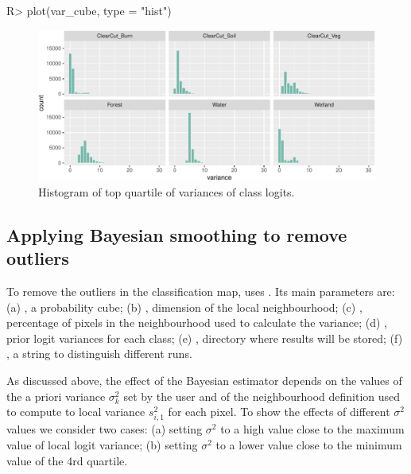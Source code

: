 \documentclass[
  shortnames]{jss}
\begin{document}
\begin{CodeChunk}
\begin{CodeInput}
R> plot(var_cube, type = "hist")
\end{CodeInput}
\begin{figure}[h]

{\centering \includegraphics{Bayesian_smoothing_JSS_files/figure-latex/vhist-1} 

}

\caption[Histogram of top quartile of variances of class logits]{Histogram of top quartile of variances of class logits.}\label{fig:vhist}
\end{figure}
\end{CodeChunk}

\hypertarget{applying-bayesian-smoothing-to-remove-outliers}{%
\subsection{Applying Bayesian smoothing to remove outliers}\label{applying-bayesian-smoothing-to-remove-outliers}}

To remove the outliers in the classification map,  uses . Its main parameters are: (a) , a probability cube; (b) , dimension of the local neighbourhood; (c) , percentage of pixels in the neighbourhood used to calculate the variance; (d) , prior logit variances for each class; (e) , directory where results will be stored; (f) , a string to distinguish different runs.

As discussed above, the effect of the Bayesian estimator depends on the values of the a priori variance \(\sigma^2_{k}\) set by the user and of the neighbourhood definition used to compute to local variance \(s^2_{i,1}\) for each pixel. To show the effects of different \(\sigma^2\) values we consider two cases: (a) setting \(\sigma^2\) to a high value close to the maximum value of local logit variance; (b) setting \(\sigma^2\) to a lower value close to the minimum value of the 4rd quartile.
\end{document}
